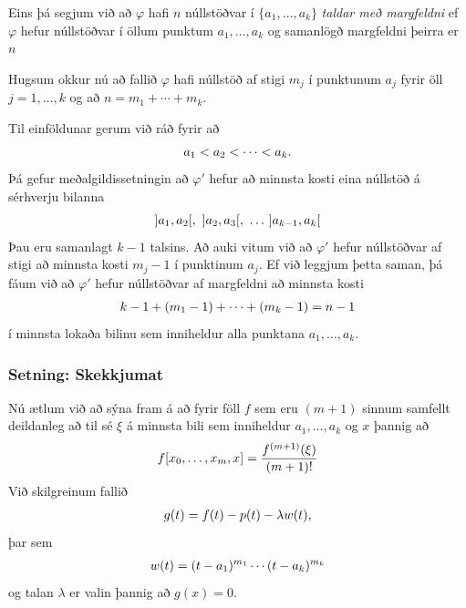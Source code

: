 \documentclass[a4paper,10pt,icelandic]{sphinxmanual}
\begin{document}
Eins þá segjum við að \(\varphi\) hafi \(n\) núllstöðvar í
\(\{a_1,\dots,a_k\}\) \emph{taldar með margfeldni} ef \(\varphi\)
hefur núllstöðvar í öllum punktum \(a_1,\dots,a_k\) og samanlögð
margfeldni þeirra er \(n\)

Hugsum okkur nú að fallið \(\varphi\) hafi núllstöð af stigi
\(m_j\) í punktunum \(a_j\) fyrir öll \(j=1,\dots,k\) og að
\(n=m_1+\cdots+m_k\).

Til einföldunar gerum við ráð fyrir að
\begin{gather}
\begin{split}a_1<a_2<\cdots<a_k.\end{split}\notag
\end{gather}
Þá gefur meðalgildissetningin að \(\varphi'\) hefur að minnsta kosti
eina núllstöð á sérhverju bilanna
\begin{gather}
\begin{split}]a_1,a_2[, \  ]a_2,a_3[, \ \dots \  ]a_{k-1},a_k[\end{split}\notag
\end{gather}
Þau eru samanlagt \(k-1\) talsins. Að auki vitum við að
\(\varphi'\) hefur núllstöðvar af stigi að minnsta kosti
\(m_j-1\) í punktinum \(a_j\). Ef við leggjum þetta saman, þá
fáum við að \(\varphi'\) hefur núllstöðvar af margfeldni að minnsta
kosti
\begin{gather}
\begin{split}k-1+(m_1-1)+\cdots+(m_k-1)=n-1\end{split}\notag
\end{gather}
í minnsta lokaða bilinu sem inniheldur alla punktana
\(a_1,\dots,a_k\).


\subsubsection{Setning: Skekkjumat}
\label{kafli03:setning-skekkjumat}
Nú ætlum við að sýna fram á að fyrir föll \(f\) sem eru
\((m+1)\) sinnum samfellt deildanleg að til sé \(\xi\) á minnsta
bili sem inniheldur \(a_1, \ldots, a_k\) og \(x\) þannig að
\begin{gather}
\begin{split}f[x_0,\ldots,x_m,x] = \frac{f^{(m+1)}(\xi)}{(m+1)!}\end{split}\notag
\end{gather}
Við skilgreinum fallið
\begin{gather}
\begin{split}g(t) = f(t) - p(t) - \lambda w(t),\end{split}\notag
\end{gather}
þar sem
\begin{gather}
\begin{split}w(t) = (t-a_1)^{m_1} \cdots (t-a_k)^{m_k}\end{split}\notag
\end{gather}
og talan \(\lambda\) er valin þannig að \(g(x) = 0\).
\end{document}
